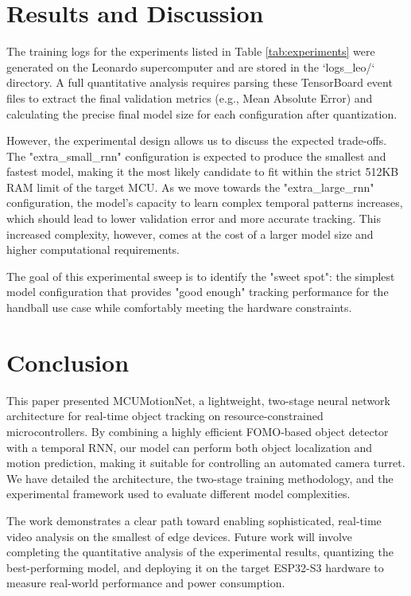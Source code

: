 \documentclass{article}
\begin{document}
\section{Results and Discussion}
The training logs for the experiments listed in Table \ref{tab:experiments} were generated on the Leonardo supercomputer and are stored in the `logs_leo/` directory. A full quantitative analysis requires parsing these TensorBoard event files to extract the final validation metrics (e.g., Mean Absolute Error) and calculating the precise final model size for each configuration after quantization.

However, the experimental design allows us to discuss the expected trade-offs. The "extra\_small\_rnn" configuration is expected to produce the smallest and fastest model, making it the most likely candidate to fit within the strict 512KB RAM limit of the target MCU. As we move towards the "extra\_large\_rnn" configuration, the model's capacity to learn complex temporal patterns increases, which should lead to lower validation error and more accurate tracking. This increased complexity, however, comes at the cost of a larger model size and higher computational requirements.

The goal of this experimental sweep is to identify the "sweet spot": the simplest model configuration that provides "good enough" tracking performance for the handball use case while comfortably meeting the hardware constraints.

\section{Conclusion}
This paper presented MCUMotionNet, a lightweight, two-stage neural network architecture for real-time object tracking on resource-constrained microcontrollers. By combining a highly efficient FOMO-based object detector with a temporal RNN, our model can perform both object localization and motion prediction, making it suitable for controlling an automated camera turret. We have detailed the architecture, the two-stage training methodology, and the experimental framework used to evaluate different model complexities.

The work demonstrates a clear path toward enabling sophisticated, real-time video analysis on the smallest of edge devices. Future work will involve completing the quantitative analysis of the experimental results, quantizing the best-performing model, and deploying it on the target ESP32-S3 hardware to measure real-world performance and power consumption.
\end{document}
